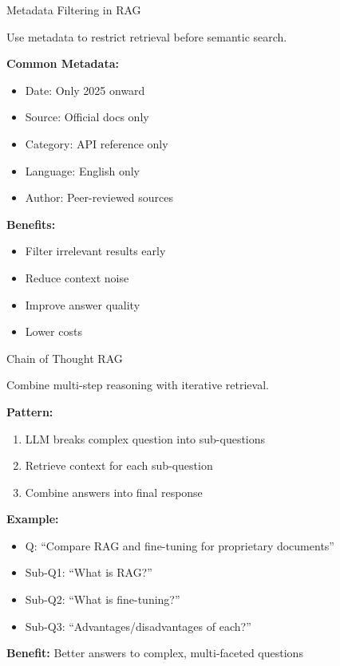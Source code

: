 \documentclass[aspectratio=169,11pt]{beamer}
\begin{document}
\begin{frame}{Metadata Filtering in RAG}
  \begin{tipbox}
    Use metadata to restrict retrieval before semantic search.
  \end{tipbox}

  \textbf{Common Metadata:}
  \begin{itemize}
    \setlength{\itemsep}{1pt}
    \item Date: Only 2025 onward
    \item Source: Official docs only
    \item Category: API reference only
    \item Language: English only
    \item Author: Peer-reviewed sources
  \end{itemize}

  \textbf{Benefits:}
  \begin{itemize}
    \setlength{\itemsep}{1pt}
    \item Filter irrelevant results early
    \item Reduce context noise
    \item Improve answer quality
    \item Lower costs
  \end{itemize}
\end{frame}

\begin{frame}{Chain of Thought RAG}
  \begin{conceptbox}[Idea]
    Combine multi-step reasoning with iterative retrieval.
  \end{conceptbox}

  \textbf{Pattern:}
  \begin{enumerate}
    \setlength{\itemsep}{0pt}
    \item LLM breaks complex question into sub-questions
    \item Retrieve context for each sub-question
    \item Combine answers into final response
  \end{enumerate}

  \textbf{Example:}
  \begin{itemize}
    \setlength{\itemsep}{1pt}
    \item Q: ``Compare RAG and fine-tuning for proprietary documents''
    \item Sub-Q1: ``What is RAG?''
    \item Sub-Q2: ``What is fine-tuning?''
    \item Sub-Q3: ``Advantages/disadvantages of each?''
  \end{itemize}

  \textbf{Benefit:} Better answers to complex, multi-faceted questions
\end{frame}
\end{document}

